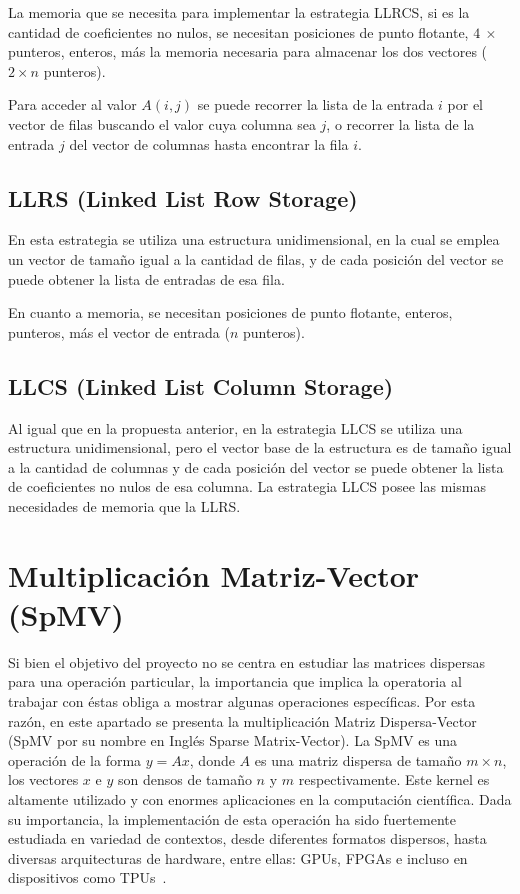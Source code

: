 La memoria que se necesita para implementar la estrategia LLRCS, si \nnz es la cantidad de coeficientes no nulos,  se necesitan \nnz posiciones de  punto flotante, $4\ \times\ $\nnz punteros, \nnz enteros, más la memoria necesaria para almacenar los dos vectores ($2 \times n$ punteros).

 Para acceder al valor $A(i,j)$ se puede recorrer la lista de la entrada $i$ por el vector de filas buscando el valor cuya columna sea $j$, o recorrer la lista de la entrada $j$ del vector de columnas hasta encontrar la fila $i$. 

\subsection{LLRS (Linked List Row Storage)}

 En esta estrategia se utiliza una estructura unidimensional, en la cual se emplea un vector de tamaño igual a la cantidad de filas, y de cada posición del vector se puede obtener la lista de entradas de esa fila.
 
 En cuanto a memoria, se necesitan \nnz posiciones de punto flotante, \nnz enteros, \nnz  punteros, más el vector de entrada ($n$ punteros). 


\subsection{LLCS (Linked List Column Storage)}

Al igual que en la propuesta anterior, en la estrategia LLCS se utiliza una estructura unidimensional, pero el vector base de la estructura es de tamaño igual a la cantidad de columnas y de cada posición del vector se puede obtener la lista de coeficientes no nulos de esa columna. La estrategia LLCS posee las mismas necesidades de memoria que la LLRS.



\section{Multiplicación Matriz-Vector (SpMV)}\label{spmv}

Si bien el objetivo del proyecto no se centra en estudiar las matrices dispersas para una operación particular, la importancia que implica la operatoria al trabajar con éstas obliga a mostrar algunas operaciones específicas. Por esta razón, en este apartado se presenta la multiplicación Matriz Dispersa-Vector (SpMV por su nombre en Inglés Sparse Matrix-Vector). La SpMV \cite{golub1996matrix} es una operación de la forma $y = Ax$, donde $A$ es una matriz dispersa de tamaño $m\times n$, los vectores $x$ e $y$ son densos de tamaño $n$ y $m$ respectivamente. Este kernel es altamente utilizado y con enormes aplicaciones en la computación científica. Dada su importancia, la implementación de esta operación ha sido fuertemente estudiada  en variedad de contextos, desde diferentes formatos dispersos, hasta diversas arquitecturas de hardware, entre ellas: GPUs, FPGAs e incluso en dispositivos como TPUs~\cite{Ku2008,Reguly2012,He2020}. %

